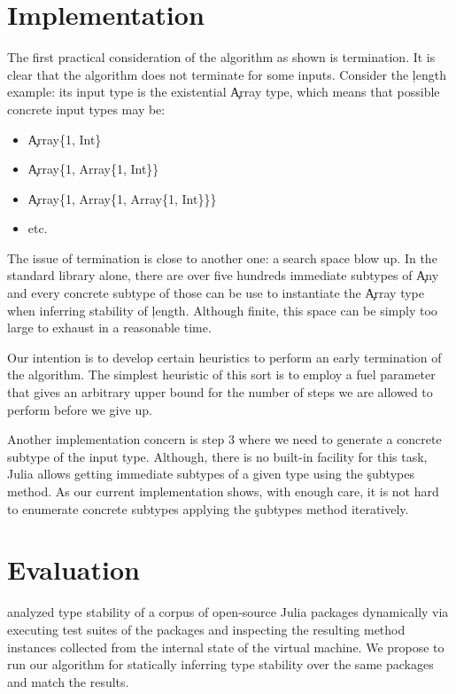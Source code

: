 \documentclass[sigplan,review,anonymous]{acmart}
\begin{document}
\section{Implementation}%
\label{sec:impl}

The first practical consideration of the algorithm as shown is termination. It
is clear that the algorithm does not terminate for some inputs. Consider the
\c{length} example: its input type is the existential \c{Array} type, which
means that possible concrete input types may be:
\begin{itemize}

  \item \c{Array\{1, Int\}}
  \item \c{Array\{1, Array\{1, Int\}\}}
  \item \c{Array\{1, Array\{1, Array\{1, Int\}\}\}}
  \item etc.
\end{itemize}

The issue of termination is close to another one: a search space blow up.
In the standard library alone, there are over five hundreds immediate subtypes
of \c{Any} and every concrete subtype of those can be use to instantiate the
\c{Array} type when inferring stability of \c{length}. Although finite, this
space can be simply too large to exhaust in a reasonable time.

Our intention is to develop certain heuristics to perform an early termination
of the algorithm. The simplest heuristic of this sort is to employ a fuel
parameter that gives an arbitrary upper bound for the number of steps we are
allowed to perform before we give up.

Another implementation concern is step 3 where we need to generate a concrete
subtype of the input type. Although, there is no built-in facility for this
task, Julia allows getting immediate subtypes of a given type using the
\c{subtypes} method. As our current implementation shows, with enough care, it
is not hard to enumerate concrete subtypes applying the \c{subtypes} method
iteratively.

\section{Evaluation}%
\label{sec:eval}

\citet{Pelenitsyn21} analyzed type stability of a corpus of open-source Julia
packages dynamically via executing test suites of the packages and inspecting the
resulting method instances collected from the internal state of the virtual
machine. We propose to run our algorithm for statically inferring type stability
over the same packages and match the results.



\end{document}
